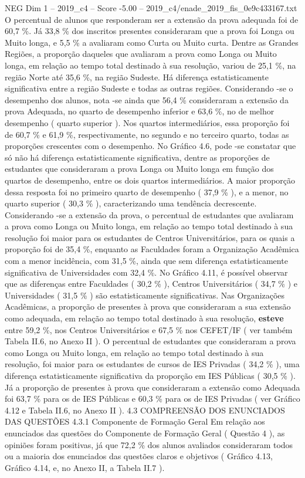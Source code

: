 \begin{textsample}{NEG Dim 1 – 2019\_c4 – Score -5.00 – 2019\_c4/enade\_2019\_fis\_0e9c433167.txt}
O percentual de alunos que responderam ser a extensão da prova adequada foi de 60,7 \%.
Já 33,8 \% dos inscritos presentes consideraram que a prova foi Longa ou Muito longa, e 5,5 \% a avaliaram como Curta ou Muito curta.
Dentre as Grandes Regiões, a proporção daqueles que avaliaram a prova como Longa ou Muito longa, em relação ao tempo total destinado à sua resolução, variou de 25,1 \%, na região Norte até 35,6 \%, na região Sudeste.
Há diferença estatisticamente significativa entre a região Sudeste e todas as outras regiões.
Considerando -se o desempenho dos alunos, nota -se ainda que 56,4 \% consideraram a extensão da prova Adequada, no quarto de desempenho inferior e 63,6 \%, no de melhor desempenho ( quarto superior ).
Nos quartos intermediários, essa proporção foi de 60,7 \% e 61,9 \%, respectivamente, no segundo e no terceiro quarto, todas as proporções crescentes com o desempenho.
No Gráfico 4.6, pode -se constatar que só não há diferença estatisticamente significativa, dentre as proporções de estudantes que consideraram a prova Longa ou Muito longa em função dos quartos de desempenho, entre os dois quartos intermediários.
A maior proporção dessa resposta foi no primeiro quarto de desempenho ( 37,9 \% ), e a menor, no quarto superior ( 30,3 \% ), caracterizando uma tendência decrescente.
Considerando -se a extensão da prova, o percentual de estudantes que avaliaram a prova como Longa ou Muito longa, em relação ao tempo total destinado à sua resolução foi maior para os estudantes de Centros Universitários, para os quais a proporção foi de 35,4 \%, enquanto as Faculdades foram a Organização Acadêmica com a menor incidência, com 31,5 \%, ainda que sem diferença estatisticamente significativa de Universidades com 32,4 \%.
No Gráfico 4.11, é possível observar que as diferenças entre Faculdades ( 30,2 \% ), Centros Universitários ( 34,7 \% ) e Universidades ( 31,5 \% ) são estatisticamente significativas.
Nas Organizações Acadêmicas, a proporção de presentes à prova que consideraram a sua extensão como adequada, em relação ao tempo total destinado à sua resolução, \textbf{esteve} entre 59,2 \%, nos Centros Universitários e 67,5 \% nos CEFET/IF ( ver também Tabela II.6, no Anexo II ).
O percentual de estudantes que consideraram a prova como Longa ou Muito longa, em relação ao tempo total destinado à sua resolução, foi maior para os estudantes de cursos de IES Privadas ( 34,2 \% ), uma diferença estatisticamente significativa da proporção em IES Públicas ( 30,5 \% ).
Já a proporção de presentes à prova que consideraram a extensão como Adequada foi 63,7 \% para os de IES Públicas e 60,3 \% para os de IES Privadas ( ver Gráfico 4.12 e Tabela II.6, no Anexo II ). 4.3 COMPREENSÃO DOS ENUNCIADOS DAS QUESTÕES 4.3.1 Componente de Formação Geral Em relação aos enunciados das questões do Componente de Formação Geral ( Questão 4 ), as opiniões foram positivas, já que 72,2 \% dos alunos avaliados consideraram todos ou a maioria dos enunciados das questões claros e objetivos ( Gráfico 4.13, Gráfico 4.14, e, no Anexo II, a Tabela II.7 ).

\end{textsample}
